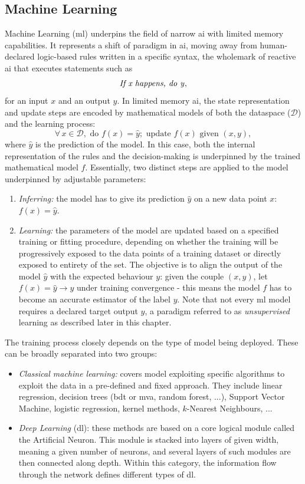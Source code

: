 \subsection{Machine Learning} 
Machine Learning (\gls{ml}) underpins the field of narrow \gls{ai} with limited memory capabilities. It represents a shift of paradigm in \gls{ai}, moving away from human-declared logic-based rules written in a specific syntax, the wholemark of reactive \gls{ai} that executes statements such as \[\textrm{\textit{If x happens, do y}},\] for an input $x$ and an output $y$. In limited memory \gls{ai}, the state representation and update steps are encoded by mathematical models of both the dataspace ($\mathcal{D}$) and the learning process: \[\forall\, x \in \mathcal{D}, \textrm{ do }f(x) = \hat{y}; \textrm{ update }f(x) \textrm{ given } (x, y),\] where $\hat{y}$ is the prediction of the model. In this case, both the internal representation of the rules and the decision-making is underpinned by the trained mathematical model $f$. Essentially, two distinct steps are applied to the model underpinned by adjustable parameters: 
\begin{enumerate}
    \item \textit{Inferring:} the model has to give its prediction $\hat{y}$ on a new data point $x$: $f(x) = \hat{y}$.
    \item \textit{Learning:} the parameters of the model are updated based on a specified training or fitting procedure, depending on whether the training will be progressively exposed to the data points of a training dataset or directly exposed to entirety of the set. The objective is to align the output of the model $\hat{y}$ with the expected behaviour $y$: given the couple $(x, y)$, let $f(x) = \hat{y} \rightarrow y$ under training convergence - this means the model $f$ has to become an accurate estimator of the label $y$. Note that not every \gls{ml} model requires a declared target output $y$, a paradigm referred to as \textit{unsupervised} learning as described later in this chapter.
\end{enumerate}
The training process closely depends on the type of model being deployed. These can be broadly separated into two groups:
\begin{itemize}
    \item \textit{Classical machine learning:} covers model exploiting specific algorithms to exploit the data in a pre-defined and fixed approach. They include linear regression, decision trees (\gls{bdt} or \gls{mva}, random forest, ...), Support Vector Machine, logistic regression, kernel methods, $k$-Nearest Neighbours, ...
    \item \textit{Deep Learning} (\gls{dl}): these methods are based on a core logical module called the Artificial Neuron. This module is stacked into layers of given width, meaning a given number of neurons, and several layers of such modules are then connected along depth. Within this category, the information flow through the network defines different types of \gls{dl}.
\end{itemize}
